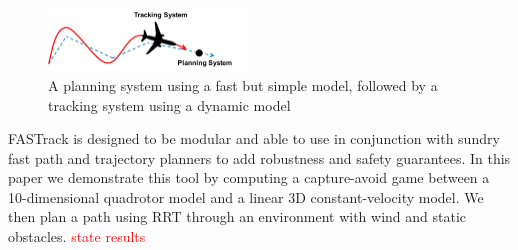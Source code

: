 \begin{figure}
	\centering
	\includegraphics[width=0.47\textwidth]{fig/chasing}
	\caption{A planning system using a fast but simple model, followed by a tracking system using a dynamic model}
	\label{fig:chasing}
\end{figure}
%
FASTrack is designed to be modular and able to use in conjunction with sundry fast path and trajectory planners to add robustness and safety guarantees. In this paper we demonstrate this tool by computing a capture-avoid game between a 10-dimensional quadrotor model and a linear 3D constant-velocity model. We then plan a path using RRT through an environment with wind and static obstacles. \textcolor{red}{state results}